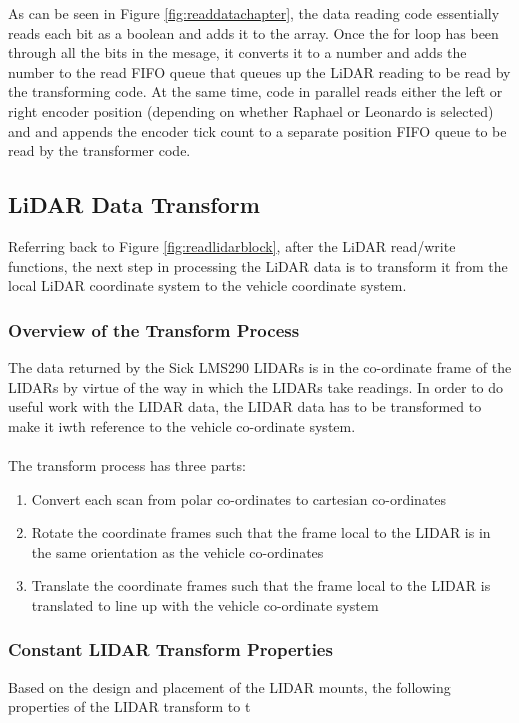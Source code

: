 \newpage

\noindent As can be seen in Figure \ref{fig:readdatachapter}, the data reading code essentially reads each bit as a boolean and adds it to the array. Once the for loop has been through all the bits in the mesage, it converts it to a number and adds the number to the read FIFO queue that queues up the LiDAR reading to be read by the transforming code. At the same time, code in parallel reads either the left or right encoder position (depending on whether Raphael or Leonardo is selected) and and appends the encoder tick count to a separate position FIFO queue to be read by the transformer code.

\subsection{LiDAR Data Transform}
Referring back to Figure \ref{fig:readlidarblock}, after the LiDAR read/write functions, the next step in processing the LiDAR data is to transform it from the local LiDAR coordinate system to the vehicle coordinate system. 

\subsubsection{Overview of the Transform Process}

The data returned by the Sick LMS290 LIDARs is in the co-ordinate frame of the LIDARs by virtue of the way in which the LIDARs take readings. In order to do useful work with the LIDAR data, the LIDAR data has to be transformed to make it iwth reference to the vehicle co-ordinate system. \\ \\
%
\noindent The transform process has three parts:

\begin{enumerate}
\item Convert each scan from polar co-ordinates to cartesian co-ordinates
\item Rotate the coordinate frames such that the frame local to the LIDAR is in the same orientation as the vehicle co-ordinates
\item Translate the coordinate frames such that the frame local to the LIDAR is translated to line up with the vehicle co-ordinate system
\end{enumerate}

\subsubsection{Constant LIDAR Transform Properties}
Based on the design and placement of the LIDAR mounts, the following properties of the LIDAR transform to t